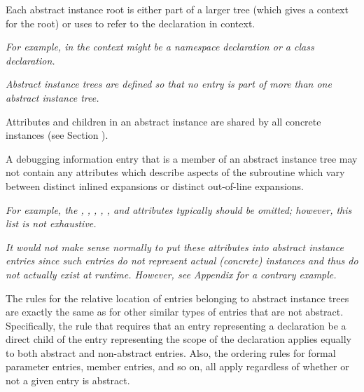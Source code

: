 Each abstract instance root is either part of a larger
tree (which gives a context for the root) or 
uses
\DWATspecification{} 
to refer to the declaration in context.

\textit{For example, in  the context might be a namespace
declaration or a class declaration.}

\textit{Abstract instance trees are defined so that no entry is part
of more than one abstract instance tree.}

Attributes and children in an abstract instance are shared
by all concrete instances (see Section ).

A debugging information entry that is a member of an abstract
instance tree may not contain any attributes which describe
aspects of the subroutine which vary between distinct inlined
expansions or distinct out-of-line expansions. 

\textit{For example,
the \DWATlowpc,
\DWAThighpc, 
\DWATranges, 
\DWATentrypc, 
\DWATlocation,
\bb
\DWATreturnaddr{}
and
\DWATstartscope{}
\eb 
attributes typically should be omitted; however, this list is not 
exhaustive.}

\textit{It would not make sense normally to put these attributes into
abstract instance entries since such entries do not represent
actual (concrete) instances and thus do not actually exist at
run\dash time.  However, 
see Appendix  
for a contrary example.}

The rules for the relative location of entries belonging to
abstract instance trees are exactly the same as for other
similar types of entries that are not abstract. Specifically,
the rule that requires that an entry representing a declaration
be a direct child of the entry representing the scope of the
declaration applies equally to both abstract and non-abstract
entries. Also, the ordering rules for formal parameter entries,
member entries, and so on, all apply regardless of whether
or not a given entry is abstract.

